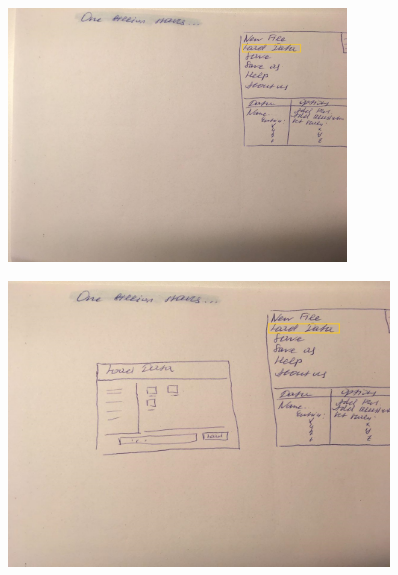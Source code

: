 \documentclass{article}
\begin{document}
\begin{itemize}
\begin{figure}[!h]
\centering
\includegraphics[width=0.8\textwidth]{images/Scenario2.jpg}
\label{fig15}
\end{figure}
\newpage
\begin{figure}[!h]
\centering
\includegraphics[width=0.9\textwidth]{images/Scenario3.jpg}
\label{fig16}
\end{figure}


\end{itemize}
\end{document}
